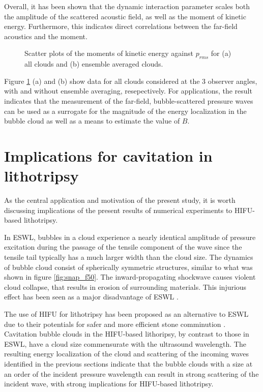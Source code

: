 \documentclass{jfm}
\begin{document}
Overall, it has been shown that the dynamic interaction parameter scales both the amplitude of the scattered acoustic field, as well as the moment of kinetic energy. Furthermore, this indicates direct correlations between the far-field acoustics and the moment.
\begin{figure}
  \center
  \caption{Scatter plots of the moments of kinetic energy against $p_{rms}$ for (a) all clouds and (b) ensemble averaged clouds.}
   \label{fig:p_xk} 
\end{figure}
Figure \ref{fig:p_xk} (a) and (b) show data for all clouds considered at the 3 observer angles, with and without ensemble averaging, resepectively. 
For applications, the result indicates that the measurement of the far-field, bubble-scattered pressure waves can be used as a surrogate for the magnitude of the energy localization in the bubble cloud as well as a means to estimate the value of $B$.

\section{Implications for cavitation in lithotripsy}
\label{section:lith}
As the central application and motivation of the present study, it is worth discussing implications of the present results of numerical experiments to HIFU-based lithotripsy.

In ESWL, bubbles in a cloud experience a nearly identical amplitude of pressure excitation during the passage of the tensile component of the wave since the tensile tail typically has a much larger width than the cloud size.
The dynamics of bubble cloud consist of spherically symmetric structures, similar to what was shown in figure \ref{fig:snap_f50}.
The inward-propagating shockwave causes violent cloud collapse, that results in erosion of surrounding materials.
This injurious effect has been seen as a major disadvantage of ESWL \citep{McAteer05,Bailey06}.

The use of HIFU for lithotripsy has been proposed as an alternative to ESWL due to their potentials for safer and more efficient stone comminution \citep{Ikeda06,Yoshizawa09,Maxwell15}.
Cavitation bubble clouds in the HIFU-based lithoripsy, by contrast to those in ESWL, have a cloud size commensurate with the ultrasound wavelength.
The resulting energy localization of the cloud and scattering of the incoming waves identified in the previous sections indicate that the bubble clouds with a size at an order of the incident pressure wavelength can result in strong scattering of the incident wave, with strong implications for HIFU-based lithotripsy.
\end{document}
